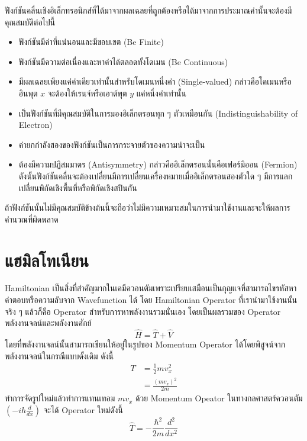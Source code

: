 ฟังก์ชันคลื่นเชิงอิเล็กทรอนิกส์ที่ได้มาจากผลเฉลยที่ถูกต้องหรือได้มาจากการประมาณค่านั้นจะต้องมีคุณสมบัติต่อไปนี้
%
\begin{itemize}[topsep=0pt,noitemsep]\setlength\itemsep{0.5em}
    \item ฟังก์ชันมีค่าที่แน่นอนและมีขอบเขต (Be Finite)

    \item ฟังก์ชันมีความต่อเนื่องและหาค่าได้ตลอดทั้งโดเมน (Be Continuous)

    \item มีผลเฉลยเพียงแค่ค่าเดียวเท่านั้นสำหรับโดเมนหนึ่งค่า (Single-valued) กล่าวคือโดเมนหรืออินพุต $x$ จะต้องให้เรนจ์หรือเอาต์พุต $y$ แค่หนึ่งค่าเท่านั้น

    \item เป็นฟังก์ชันที่มีคุณสมบัติในการมองอิเล็กตรอนทุก ๆ ตัวเหมือนกัน (Indistinguishability of Electron)

    \item ค่ายกกำลังสองของฟังก์ชันเป็นการกระจายตัวของความน่าจะเป็น

    \item ต้องมีความปฏิสมมาตร (Antisymmetry) กล่าวคืออิเล็กตรอนนั้นคือเฟอร์มิออน (Fermion)\autocite{atkins2010} ดังนั้นฟังก์ชันคลื่นจะต้องเปลี่ยนมีการเปลี่ยนเครื่องหมายเมื่ออิเล็กตรอนสองตัวใด ๆ มีการแลกเปลี่ยนพิกัดเชิงพื้นที่หรือพิกัดเชิงสปินกัน
\end{itemize}

ถ้าฟังก์ชันนั้นไม่มีคุณสมบัติข้างต้นนี้จะถือว่าไม่มีความเหมาะสมในการนำมาใช้งานและจะให้ผลการคำนวณที่ผิดพลาด

\section{แฮมิลโทเนียน}
\label{sec:hamiltonian}

Hamiltonian เป็นสิ่งที่สำคัญมากในเคมีควอนตัมเพราะเปรียบเสมือนเป็นกุญแจที่สามารถไขรหัสหาคำตอบหรือความลับจาก Wavefunction ได้ โดย Hamiltonian Operator ที่เรานำมาใช้งานนั้นจริง ๆ แล้วก็คือ Operator สำหรับการหาพลังงานรวมนั่นเอง โดยเป็นผลรวมของ Operator พลังงานจลน์และพลังงานศักย์
%
\begin{equation}\label{eq:hamil}
    \hat{H} = \hat{T} + \hat{V}
\end{equation}
%
\noindent โดยที่พลังงานจลน์นั้นสามารถเขียนให้อยู่ในรูปของ Momentum Operator ได้โดยพิสูจน์จากพลังงานจลน์ในกรณีแบบดั้งเดิม ดังนี้
%
\begin{align}
    T & = \frac{1}{2}mv^{2}_{x}   \\
      & = \frac{(mv_{x})^{2}}{2m}
\end{align}
%
\noindent ทำการจัดรูปใหม่แล้วทำการแทนเทอม $mv_{x}$ ด้วย Momentum Opeator ในทางกลศาสตร์ควอนตัม $(-ih\frac{d}{dx})$ จะได้ Operator ใหม่ดังนี้
%
\begin{equation}\label{eq:kin_ener_oper}
    \hat{T} = -\frac{\hbar^{2}}{2m}\frac{d^{2}}{dx^{2}}
\end{equation}

